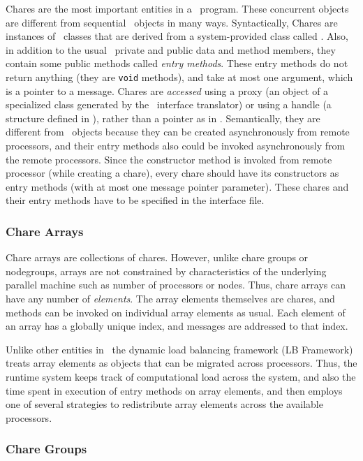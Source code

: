 {Chares are the most important entities in a \charmpp\ program. These concurrent
objects are different from sequential \CC\ objects in many ways. Syntactically,
Chares are instances of \CC\  classes that are derived from a system-provided
class called . Also, in addition to the usual \CC\ private and public
data and method members, they contain some public methods called {\em entry
methods}. These entry methods do not return anything (they are {\tt void}
methods), and take at most one argument, which is a pointer to a message.
Chares are {\em accessed} using a proxy (an object of a specialized class
generated by the \charmpp\ interface translator) or using a handle (a  structure defined in \charmpp), rather than a pointer as in \CC.
Semantically, they are different from \CC\ objects because they can be created
asynchronously from remote processors, and their entry methods also could be
invoked asynchronously from the remote processors. Since the constructor method
is invoked from remote processor (while creating a chare), every chare should
have its constructors as entry methods (with at most one message pointer
parameter). These chares and their entry methods have to be specified in the
interface file.

\subsubsection{Chare Arrays}

Chare arrays are collections of chares. However, unlike chare groups or
nodegroups, arrays are not constrained by characteristics of the underlying
parallel machine such as number of processors or nodes. Thus, chare arrays
can have any number of {\em elements}. The array elements themselves are
chares, and methods can be invoked on individual array elements as usual.  
Each element of an array has a globally unique index, and messages are
addressed to that index.

Unlike other entities in \charmpp\, the dynamic load balancing framework (LB
Framework) treats array elements as objects that can be migrated across
processors. Thus, the runtime system keeps track of computational load
across the system, and also the time spent in execution of entry methods on
array elements, and then employs one of several strategies to redistribute
array elements across the available processors.

\subsubsection{Chare Groups}

}
